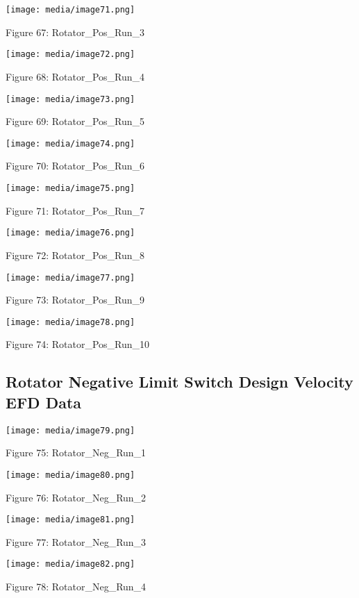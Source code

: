 \documentclass[SE,lsstdraft,authoryear,toc]{lsstdoc}
\begin{document}
\texttt{[image: media/image71.png]}

Figure 67: Rotator\_Pos\_Run\_3

\texttt{[image: media/image72.png]}

Figure 68: Rotator\_Pos\_Run\_4

\texttt{[image: media/image73.png]}

Figure 69: Rotator\_Pos\_Run\_5

\texttt{[image: media/image74.png]}

Figure 70: Rotator\_Pos\_Run\_6

\texttt{[image: media/image75.png]}

Figure 71: Rotator\_Pos\_Run\_7

\texttt{[image: media/image76.png]}

Figure 72: Rotator\_Pos\_Run\_8

\texttt{[image: media/image77.png]}

Figure 73: Rotator\_Pos\_Run\_9

\texttt{[image: media/image78.png]}

Figure 74: Rotator\_Pos\_Run\_10

\hypertarget{rotator-negative-limit-switch-design-velocity-efd-data}{%
\subsection{Rotator Negative Limit Switch Design Velocity EFD
Data}\label{rotator-negative-limit-switch-design-velocity-efd-data}}

\texttt{[image: media/image79.png]}

Figure 75: Rotator\_Neg\_Run\_1

\texttt{[image: media/image80.png]}

Figure 76: Rotator\_Neg\_Run\_2

\texttt{[image: media/image81.png]}

Figure 77: Rotator\_Neg\_Run\_3

\texttt{[image: media/image82.png]}

Figure 78: Rotator\_Neg\_Run\_4
\end{document}
